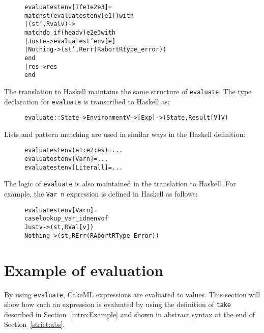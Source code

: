 \begin{figure}[H]
\begin{alltt}
  evaluate st env [If e1 e2 e3] =
    match st (evaluate st env [e1]) with
    | (st', Rval v) ->
        match do_if (head v) e2 e3 with
        | Just e -> evaluate st' env [e]
        | Nothing -> (st', Rerr (Rabort Rtype_error))
        end
    | res -> res
    end
\end{alltt}
\end{figure}

The translation to Haskell maintains the same structure of \texttt{evaluate}.
The type declaration for \texttt{evaluate} is transcribed to Haskell as:
\begin{figure}[H]
\begin{alltt}
  evaluate :: State -> Environment V -> [Exp] -> (State, Result [V] V)
\end{alltt}
\end{figure}

\noindent Lists and pattern matching are used in similar ways in the Haskell definition:

\begin{figure}[H]
\begin{alltt}
  evaluate st env (e1:e2:es)  = ...
  evaluate st env [Var n]     = ...
  evaluate st env [Literal l] = ...
\end{alltt}
\end{figure}

\noindent The logic of \texttt{evaluate} is also maintained in the translation
to Haskell. For example, the \texttt{Var n} expression is defined in Haskell as
follows:

\begin{figure}[H]
\begin{alltt}
  evaluate st env [Var n] =
    case lookup_var_id n env of
      Just v  -> (st, RVal [v])
      Nothing -> (st, RErr (RAbort RType_Error))
\end{alltt}
\end{figure}

\section{Example of evaluation}
\label{strict:example}
By using \texttt{evaluate}, CakeML expressions are evaluated to values. This
section will show how such an expression is evaluated by using the definition of
\texttt{take} described in Section~\ref{intro:Example} and shown in abstract
syntax at the end of Section~\ref{strict:abs}.

